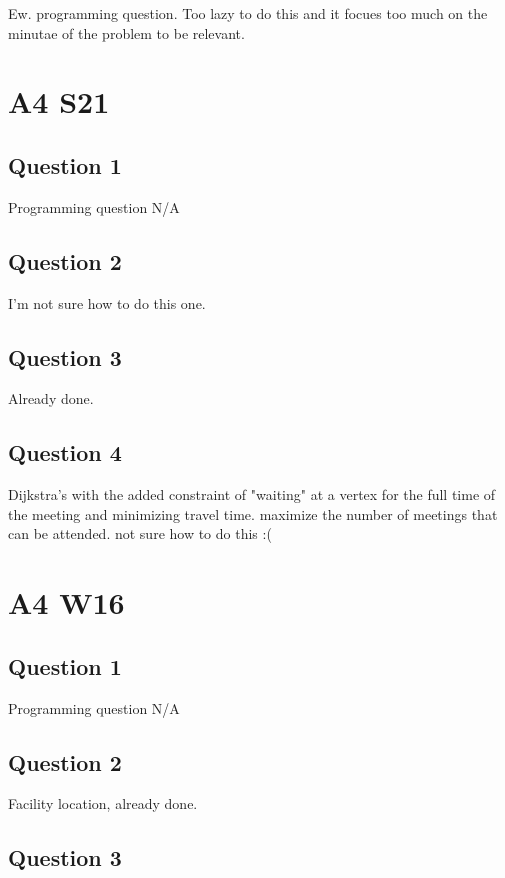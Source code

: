 \documentclass[11pt]{article}
\begin{document}
Ew. programming question. Too lazy to do this and it focues too much on the minutae of the problem to be relevant.

\section{A4 S21}

\subsection{Question 1}

Programming question N/A

\subsection{Question 2}

I'm not sure how to do this one.

\subsection{Question 3}

Already done.

\subsection{Question 4}

Dijkstra's with the added constraint of "waiting" at a vertex for the full time of the meeting and minimizing travel time. maximize the number of meetings that can be attended. not sure how to do this :(

\section{A4 W16}

\subsection{Question 1}

Programming question N/A

\subsection{Question 2}

Facility location, already done.

\subsection{Question 3}
\end{document}
